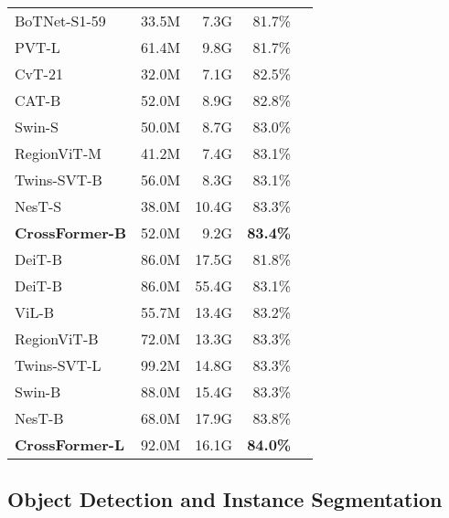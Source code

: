 \documentclass{article} \usepackage{iclr2022_conference,times}
\begin{document}
\begin{table}[]
{{\begin{subtable}[h]{0.57\textwidth}
\begin{tabular}{l|rrrr}
                    \midrule
                    BoTNet-S1-59 & 33.5M & 7.3G & 81.7\% \\
                    PVT-L & 61.4M & 9.8G & 81.7\%  \\ CvT-21 & 32.0M & 7.1G & 82.5\%  \\ CAT-B & 52.0M & 8.9G & 82.8\%  \\ Swin-S & 50.0M & 8.7G & 83.0\%  \\ RegionViT-M & 41.2M & 7.4G & 83.1\%  \\ Twins-SVT-B  & 56.0M & 8.3G & 83.1\% \\ NesT-S & 38.0M & 10.4G & 83.3\% \\ \textbf{CrossFormer-B} & 52.0M & 9.2G & \textbf{83.4\%}  \\ \midrule
                    DeiT-B & 86.0M & 17.5G & 81.8\% \\ DeiT-B & 86.0M & 55.4G & 83.1\% \\
                    ViL-B & 55.7M & 13.4G & 83.2\% \\
                    RegionViT-B & 72.0M & 13.3G & 83.3\% \\
                    Twins-SVT-L & 99.2M & 14.8G & 83.3\% \\
                    Swin-B & 88.0M & 15.4G & 83.3\% \\
                    NesT-B & 68.0M & 17.9G & 83.8\% \\
                    \textbf{CrossFormer-L} & 92.0M & 16.1G & \textbf{84.0\%} \\
                    \bottomrule
                \end{tabular}
    \end{subtable}}}
    \vspace{-4mm}
    \label{tab:classification}
\end{table}

\vspace{-2mm}
\subsection{Object Detection and Instance Segmentation}
\vspace{-1mm}
\end{document}
